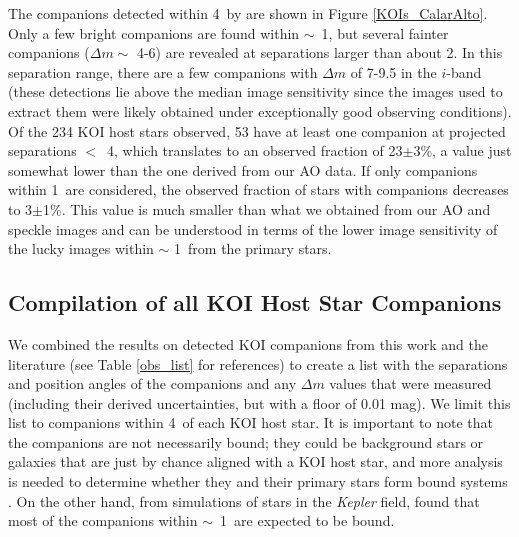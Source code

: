 \documentclass[twocolumn,appendixfloats]{aastex6}
\begin{document}
The companions detected within 4\arcsec\ by \citet{lillo-box12, lillo-box14} 
are shown in Figure \ref{KOIs_CalarAlto}. Only a few bright companions are 
found within $\sim$~1\arcsec, but several fainter companions ($\Delta m 
\sim$ 4-6) are revealed at separations larger than about 2\arcsec. In this 
separation range, there are a few companions with $\Delta m$ of 7-9.5 in 
the $i$-band (these detections lie above the median image sensitivity since 
the images used to extract them were likely obtained under exceptionally 
good observing conditions).
Of the 234 KOI host stars observed, 53 have at least one companion
at projected separations $<$~4\arcsec, which translates to an observed 
fraction of 23$\pm$3\%, a value just somewhat lower than the one derived
from our AO data. If only companions within 1\arcsec\ are considered, 
the observed fraction of stars with companions decreases to 3$\pm$1\%.
This value is much smaller than what we obtained from our AO and 
speckle images and can be understood in terms of the lower image
sensitivity of the lucky images within $\sim$ 1\arcsec\ from the
primary stars. 


\newpage

\subsection{Compilation of all KOI Host Star Companions}

We combined the results on detected KOI companions from this work
and the literature (see Table \ref{obs_list} for references) to create 
a list with the separations and position angles of the companions and 
any $\Delta m$ values that were measured (including their derived
uncertainties, but with a floor of 0.01 mag). We limit this list to companions 
within 4\arcsec\ of each KOI host star. It is important to note that the 
companions are not necessarily bound; they could be background stars 
or galaxies that are just by chance aligned with a KOI host star, and more 
analysis is needed to determine whether they and their primary stars form 
bound systems \citep[see][]{teske15,hirsch16}. On the other hand, from 
simulations of stars in the {\it Kepler} field, \citet{horch14} found that most 
of the companions within $\sim$~1\arcsec\ are expected to be bound. 
\end{document}
